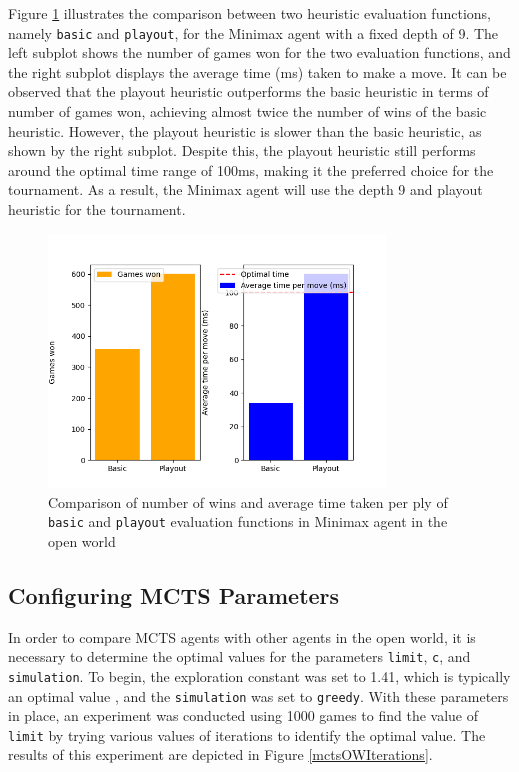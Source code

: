 Figure \ref{minimaxOWEval} illustrates the comparison between two heuristic evaluation functions, namely \texttt{basic} and \texttt{playout}, for the Minimax agent with a fixed depth of 9. The left subplot shows the number of games won for the two evaluation functions, and the right subplot displays the average time (ms) taken to make a move. It can be observed that the playout heuristic outperforms the basic heuristic in terms of number of games won, achieving almost twice the number of wins of the basic heuristic. However, the playout heuristic is slower than the basic heuristic, as shown by the right subplot. Despite this, the playout heuristic still performs around the optimal time range of 100ms, making it the preferred choice for the tournament. As a result, the Minimax agent will use the depth 9 and playout heuristic for the tournament.

\begin{figure}[h]
  \centering
  \captionsetup{justification=centering}
  \includegraphics[width=0.8\textwidth]{../img/minimax_eval_openworld.png}
  \caption{Comparison of number of wins and average time taken per ply of \texttt{basic} and \texttt{playout} evaluation functions in Minimax agent in the open world}
  \label{minimaxOWEval}
\end{figure}

\subsection{Configuring MCTS Parameters}

In order to compare MCTS agents with other agents in the open world, it is necessary to determine the optimal values for the parameters \texttt{limit}, \texttt{c}, and \texttt{simulation}. To begin, the exploration constant was set to 1.41, which is typically an optimal value \citep{AI4Ed}, and the \texttt{simulation} was set to \texttt{greedy}. With these parameters in place, an experiment was conducted using 1000 games to find the value of \texttt{limit} by trying various values of iterations to identify the optimal value. The results of this experiment are depicted in Figure \ref{mctsOWIterations}.

